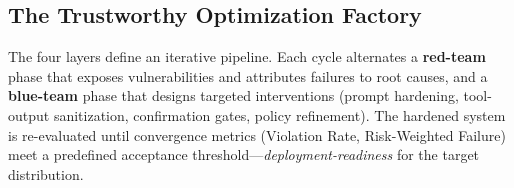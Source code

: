 

\subsection{The Trustworthy Optimization Factory}
\label{subsec:factory}

The four layers define an iterative pipeline. Each cycle alternates a \textbf{red-team} phase that exposes vulnerabilities and attributes failures to root causes, and a \textbf{blue-team} phase that designs targeted interventions (prompt hardening, tool-output sanitization, confirmation gates, policy refinement). The hardened system is re-evaluated until convergence metrics (Violation Rate, Risk-Weighted Failure) meet a predefined acceptance threshold---\emph{deployment-readiness} for the target distribution.
